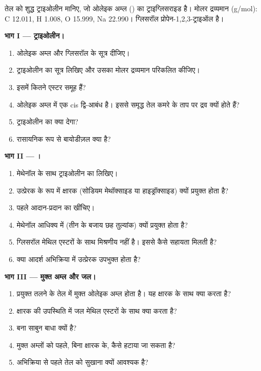 \begin{problem}
\label{pb:b2:acyl-substitution:1}
तेल को शुद्ध ट्राइओलीन मानिए, जो ओलेइक अम्ल () का ट्राइग्लिसराइड है। मोलर द्रव्यमान
(\unit{g/mol}): C 12.011, H 1.008, O 15.999, Na 22.990। ग्लिसरॉल प्रोपेन-1,2,3-ट्राइऑल है।

\medskip
\noindent\textbf{भाग I --- ट्राइओलीन।}
\begin{enumerate}
  \item ओलेइक अम्ल और ग्लिसरॉल के सूत्र दीजिए।
  \item ट्राइओलीन का सूत्र लिखिए और उसका मोलर द्रव्यमान परिकलित कीजिए।
  \item इसमें कितने एस्टर समूह हैं?
  \item ओलेइक अम्ल में एक cis द्वि-आबंध है। इससे समृद्ध तेल कमरे के ताप पर द्रव क्यों होते हैं?
  \item ट्राइओलीन का  क्या देगा?
  \item रासायनिक रूप से बायोडीज़ल क्या है?
\end{enumerate}

\medskip
\noindent\textbf{भाग II --- ।}
\begin{enumerate}[resume]
  \item मेथेनॉल के साथ ट्राइओलीन का  लिखिए।
  \item उत्प्रेरक के रूप में क्षारक (सोडियम मेथॉक्साइड या हाइड्रॉक्साइड) क्यों प्रयुक्त होता है?
  \item पहले आदान-प्रदान का  खींचिए।
  \item मेथेनॉल आधिक्य में (तीन के बजाय छह तुल्यांक) क्यों प्रयुक्त होता है?
  \item ग्लिसरॉल मेथिल एस्टरों के साथ मिश्रणीय नहीं है। इससे कैसे सहायता मिलती है?
  \item क्या आदर्श अभिक्रिया में उत्प्रेरक उपभुक्त होता है?
\end{enumerate}

\medskip
\noindent\textbf{भाग III --- मुक्त अम्ल और जल।}
\begin{enumerate}[resume]
  \item प्रयुक्त तलने के तेल में मुक्त ओलेइक अम्ल होता है। यह क्षारक के साथ क्या करता है?
  \item क्षारक की उपस्थिति में जल मेथिल एस्टरों के साथ क्या करता है?
  \item बना साबुन बाधा क्यों है?
  \item मुक्त अम्लों को पहले, बिना क्षारक के, कैसे हटाया जा सकता है?
  \item अभिक्रिया से पहले तेल को सुखाना क्यों आवश्यक है?
\end{enumerate}


\end{problem}
